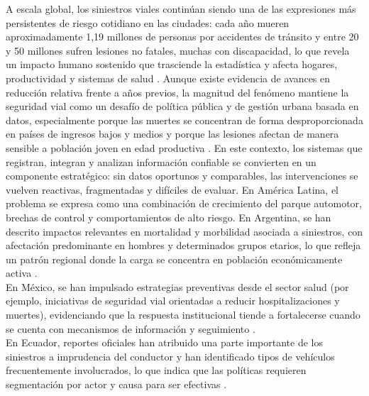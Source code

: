 \bigskip

A escala global, los siniestros viales continúan siendo una de las expresiones más persistentes de riesgo cotidiano en las ciudades: cada año mueren aproximadamente 1,19 millones de personas por accidentes de tránsito y entre 20 y 50 millones sufren lesiones no fatales, muchas con discapacidad, lo que revela un impacto humano sostenido que trasciende la estadística y afecta hogares, productividad y sistemas de salud \cite{ramirez2024}. Aunque existe evidencia de avances en reducción relativa frente a años previos, la magnitud del fenómeno mantiene la seguridad vial como un desafío de política pública y de gestión urbana basada en datos, especialmente porque las muertes se concentran de forma desproporcionada en países de ingresos bajos y medios y porque las lesiones afectan de manera sensible a población joven en edad productiva \cite{oms2024}. En este contexto, los sistemas que registran, integran y analizan información confiable se convierten en un componente estratégico: sin datos oportunos y comparables, las intervenciones se vuelven reactivas, fragmentadas y difíciles de evaluar.
En América Latina, el problema se expresa como una combinación de crecimiento del parque automotor, brechas de control y comportamientos de alto riesgo. En Argentina, se han descrito impactos relevantes en mortalidad y morbilidad asociada a siniestros, con afectación predominante en hombres y determinados grupos etarios, lo que refleja un patrón regional donde la carga se concentra en población económicamente activa \cite{aguilar2023}.\\

En México, se han impulsado estrategias preventivas desde el sector salud (por ejemplo, iniciativas de seguridad vial orientadas a reducir hospitalizaciones y muertes), evidenciando que la respuesta institucional tiende a fortalecerse cuando se cuenta con mecanismos de información y seguimiento \cite{ops2023}.\\

En Ecuador, reportes oficiales han atribuido una parte importante de los siniestros a imprudencia del conductor y han identificado tipos de vehículos frecuentemente involucrados, lo que indica que las políticas requieren segmentación por actor y causa para ser efectivas \cite{oviedo2025}.\\

